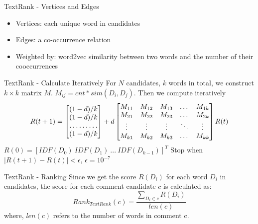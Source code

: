 \documentclass[aspectratio=169]{beamer}
\begin{document}
    \begin{frame}{TextRank - Vertices and Edges}
      \begin{itemize}
        \item Vertices: each unique word in candidates
        \item Edges: a co-occurrence relation
        \item Weighted by: word2vec similarity between two words and the number of their cooccurrences
      \end{itemize}
    \end{frame}

    \begin{frame}{TextRank - Calculate Iteratively}
      For $N$ candidates, $k$ words in total, we construct $ k \times k $ 
      matrix $M$. $M_{ij} = cnt * sim(D_i, D_j)$. Then we compute iteratively
      \[
      R(t+1) = 
      \begin{bmatrix}
          (1-d)/k       \\
          (1-d)/k       \\
          \hdotsfor{1} \\
          (1-d)/k       
      \end{bmatrix}
      +d
      \begin{bmatrix}
          M_{11} & M_{12} & M_{13} & \dots  & M_{1k} \\
          M_{21} & M_{22} & M_{23} & \dots  & M_{2k} \\
          \vdots & \vdots & \vdots & \ddots & \vdots \\
          M_{k1} & M_{k2} & M_{k3} & \dots  & M_{kk}
      \end{bmatrix}
      R(t)
      \]
      $R(0) = [IDF(D_0) \ IDF(D_1) \ ... \ IDF(D_{k-1})]^T$ \newline
      Stop when $|R(t+1)-R(t)|<\epsilon$, $\epsilon = 10^{-7}$
    \end{frame}

    \begin{frame}{TextRank - Ranking}
      Since we get the score $R(D_i)$ for each word $D_i$ in candidates, the 
      score for each comment candidate $c$ is calculated as:
      \begin{equation}
        Rank_{TextRank}(c) = \frac{\sum_{D_i \in c}{R(D_i)}}{len(c)} 
      \end{equation}
      where, $len(c)$ refers to the number of words in comment c.
    \end{frame}
\end{document}
